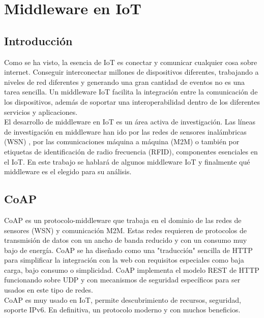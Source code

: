 \documentclass[12pt, twoside]{book}
\begin{document}
\chapter{Middleware en IoT}
\section{Introducción}
Como se ha visto, la esencia de IoT es conectar y comunicar cualquier cosa sobre internet. Conseguir interconectar millones de dispositivos diferentes, trabajando a niveles de red diferentes y generando una gran cantidad de eventos no es una tarea sencilla. Un middleware IoT facilita la integración entre la comunicación de los dispositivos, además de soportar una interoperabilidad dentro de los diferentes servicios y aplicaciones.\\El desarrollo de middleware en IoT es un área activa de investigación. Las líneas de investigación en middleware han ido por las redes de sensores inalámbricas (WSN) , por las comunicaciones máquina a máquina (M2M) o también por etiquetas de identificación de radio frecuencia (RFID), componentes esenciales en el IoT. En este trabajo se hablará de algunos middleware IoT y finalmente qué middleware es el elegido para su análisis.

\section{CoAP}
CoAP es un protocolo-middleware que trabaja en el dominio de las redes de sensores (WSN) y comunicación M2M. Estas redes requieren de protocolos de transmisión de datos con un ancho de banda reducido y con un consumo muy bajo de energía. CoAP se ha diseñado como una "traducción" sencilla de HTTP para simplificar la integración con la web con requisitos especiales como baja carga, bajo consumo o simplicidad. CoAP implementa el modelo REST de HTTP funcionando sobre UDP y con mecanismos de seguridad específicos para ser usados en este tipo de redes. \\
CoAP es muy usado en IoT, permite descubrimiento de recursos, seguridad, soporte IPv6. En definitiva, un protocolo moderno y con muchos beneficios.
\end{document}
